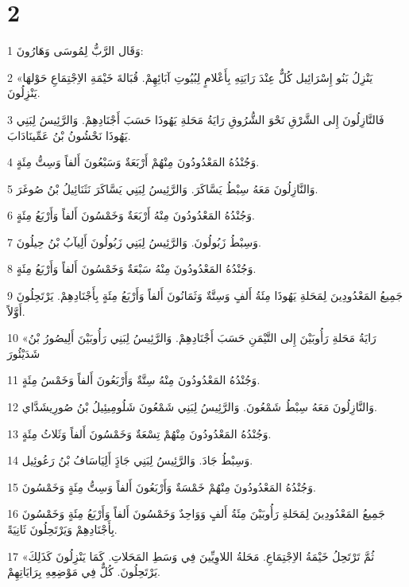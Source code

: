 \chapter{2}

\par 1 وَقَال الرَّبُّ لِمُوسَى وَهَارُونَ:
\par 2 «يَنْزِلُ بَنُو إِسْرَائِيل كُلٌّ عِنْدَ رَايَتِهِ بِأَعْلامٍ لِبُيُوتِ آبَائِهِمْ. قُبَالةَ خَيْمَةِ الاِجْتِمَاعِ حَوْلهَا يَنْزِلُونَ.
\par 3 فَالنَّازِلُونَ إِلى الشَّرْقِ نَحْوَ الشُّرُوقِ رَايَةُ مَحَلةِ يَهُوذَا حَسَبَ أَجْنَادِهِمْ. وَالرَّئِيسُ لِبَنِي يَهُوذَا نَحْشُونُ بْنُ عَمِّينَادَابَ.
\par 4 وَجُنْدُهُ المَعْدُودُونَ مِنْهُمْ أَرْبَعَةٌ وَسَبْعُونَ أَلفاً وَسِتُّ مِئَةٍ.
\par 5 وَالنَّازِلُونَ مَعَهُ سِبْطُ يَسَّاكَرَ. وَالرَّئِيسُ لِبَنِي يَسَّاكَرَ نَثَنَائِيلُ بْنُ صُوغَرَ.
\par 6 وَجُنْدُهُ المَعْدُودُونَ مِنْهُ أَرْبَعَةٌ وَخَمْسُونَ أَلفاً وَأَرْبَعُ مِئَةٍ.
\par 7 وَسِبْطُ زَبُولُونَ. وَالرَّئِيسُ لِبَنِي زَبُولُونَ أَلِيآبُ بْنُ حِيلُونَ.
\par 8 وَجُنْدُهُ المَعْدُودُونَ مِنْهُ سَبْعَةٌ وَخَمْسُونَ أَلفاً وَأَرْبَعُ مِئَةٍ.
\par 9 جَمِيعُ المَعْدُودِينَ لِمَحَلةِ يَهُوذَا مِئَةُ أَلفٍ وَسِتَّةٌ وَثَمَانُونَ أَلفاً وَأَرْبَعُ مِئَةٍ بِأَجْنَادِهِمْ. يَرْتَحِلُونَ أَوَّلاً.
\par 10 «رَايَةُ مَحَلةِ رَأُوبَيْنَ إِلى التَّيْمَنِ حَسَبَ أَجْنَادِهِمْ. وَالرَّئِيسُ لِبَنِي رَأُوبَيْنَ أَلِيصُورُ بْنُ شَدَيْئُورَ
\par 11 وَجُنْدُهُ المَعْدُودُونَ مِنْهُ سِتَّةٌ وَأَرْبَعُونَ أَلفاً وَخَمْسُ مِئَةٍ.
\par 12 وَالنَّازِلُونَ مَعَهُ سِبْطُ شَمْعُونَ. وَالرَّئِيسُ لِبَنِي شَمْعُونَ شَلُومِيئِيلُ بْنُ صُورِيشَدَّاي.
\par 13 وَجُنْدُهُ المَعْدُودُونَ مِنْهُمْ تِسْعَةٌ وَخَمْسُونَ أَلفاً وَثَلاثُ مِئَةٍ.
\par 14 وَسِبْطُ جَادَ. وَالرَّئِيسُ لِبَنِي جَادٍَ أَلِيَاسَافُ بْنُ رَعُوئِيل.
\par 15 وَجُنْدُهُ المَعْدُودُونَ مِنْهُمْ خَمْسَةٌ وَأَرْبَعُونَ أَلفاً وَسِتُّ مِئَةٍ وَخَمْسُونَ.
\par 16 جَمِيعُ المَعْدُودِينَ لِمَحَلةِ رَأُوبَيْنَ مِئَةُ أَلفٍ وَوَاحِدٌ وَخَمْسُونَ أَلفاً وَأَرْبَعُ مِئَةٍ وَخَمْسُونَ بِأَجْنَادِهِمْ وَيَرْتَحِلُونَ ثَانِيَةً.
\par 17 «ثُمَّ تَرْتَحِلُ خَيْمَةُ الاِجْتِمَاعِ. مَحَلةُ اللاوِيِّينَ فِي وَسَطِ المَحَلاتِ. كَمَا يَنْزِلُونَ كَذَلِكَ يَرْتَحِلُونَ. كُلٌّ فِي مَوْضِعِهِ بِرَايَاتِهِمْ.

